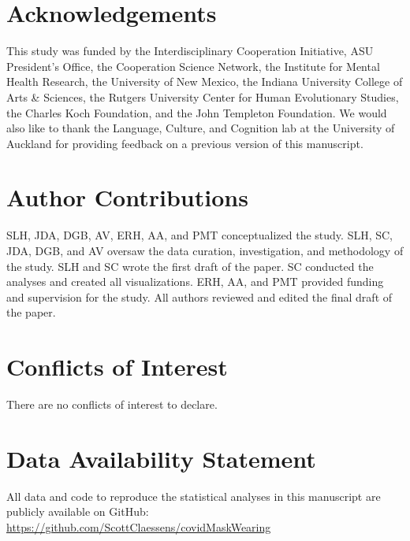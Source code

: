 \documentclass[
  man, donotrepeattitle,floatsintext]{apa6}
\begin{document}
\newpage
\nolinenumbers

\hypertarget{acknowledgements}{%
\section{Acknowledgements}\label{acknowledgements}}

This study was funded by the Interdisciplinary Cooperation Initiative, ASU President's Office, the Cooperation Science Network, the Institute for Mental Health Research, the University of New Mexico, the Indiana University College of Arts \& Sciences, the Rutgers University Center for Human Evolutionary Studies, the Charles Koch Foundation, and the John Templeton Foundation. We would also like to thank the Language, Culture, and Cognition lab at the University of Auckland for providing feedback on a previous version of this manuscript.

\hypertarget{author-contributions}{%
\section{Author Contributions}\label{author-contributions}}

SLH, JDA, DGB, AV, ERH, AA, and PMT conceptualized the study. SLH, SC, JDA, DGB, and AV oversaw the data curation, investigation, and methodology of the study. SLH and SC wrote the first draft of the paper. SC conducted the analyses and created all visualizations. ERH, AA, and PMT provided funding and supervision for the study. All authors reviewed and edited the final draft of the paper.

\hypertarget{conflicts-of-interest}{%
\section{Conflicts of Interest}\label{conflicts-of-interest}}

There are no conflicts of interest to declare.

\hypertarget{data-availability-statement}{%
\section{Data Availability Statement}\label{data-availability-statement}}

All data and code to reproduce the statistical analyses in this manuscript are publicly available on GitHub: \url{https://github.com/ScottClaessens/covidMaskWearing}

\newpage
\end{document}
